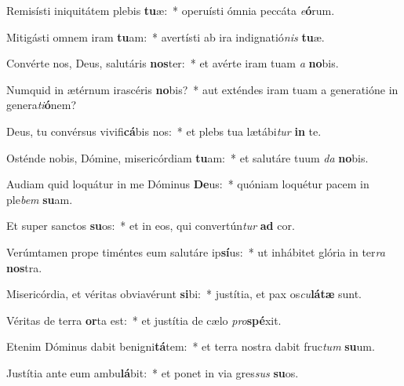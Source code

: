\item Remisísti iniquitátem plebis \textbf{tu}æ:~* operuísti ómnia peccáta \textit{e}\textbf{ó}rum.
\item Mitigásti omnem iram \textbf{tu}am:~* avertísti ab ira indignatió\textit{nis} \textbf{tu}æ.
\item Convérte nos, Deus, salutáris \textbf{nos}ter:~* et avérte iram tuam \textit{a} \textbf{no}bis.
\item Numquid in ætérnum irascéris \textbf{no}bis?~* aut exténdes iram tuam a generatióne in genera\textit{ti}\textbf{ó}nem?
\item Deus, tu convérsus vivifi\textbf{cá}bis nos:~* et plebs tua lætábi\textit{tur} \textbf{in} te.
\item Osténde nobis, Dómine, misericórdiam \textbf{tu}am:~* et salutáre tuum \textit{da} \textbf{no}bis.
\item Audiam quid loquátur in me Dóminus \textbf{De}us:~* quóniam loquétur pacem in ple\textit{bem} \textbf{su}am.
\item Et super sanctos \textbf{su}os:~* et in eos, qui convertún\textit{tur} \textbf{ad} cor.
\item Verúmtamen prope timéntes eum salutáre ip\textbf{sí}us:~* ut inhábitet glória in ter\textit{ra} \textbf{nos}tra.
\item Misericórdia, et véritas obviavérunt \textbf{si}bi:~* justítia, et pax os\textit{cu}\textbf{lá}\textbf{tæ} sunt.
\item Véritas de terra \textbf{or}ta est:~* et justítia de cælo \textit{pro}\textbf{spé}xit.
\item Etenim Dóminus dabit benigni\textbf{tá}tem:~* et terra nostra dabit fruc\textit{tum} \textbf{su}um.
\item Justítia ante eum ambu\textbf{lá}bit:~* et ponet in via gres\textit{sus} \textbf{su}os.
